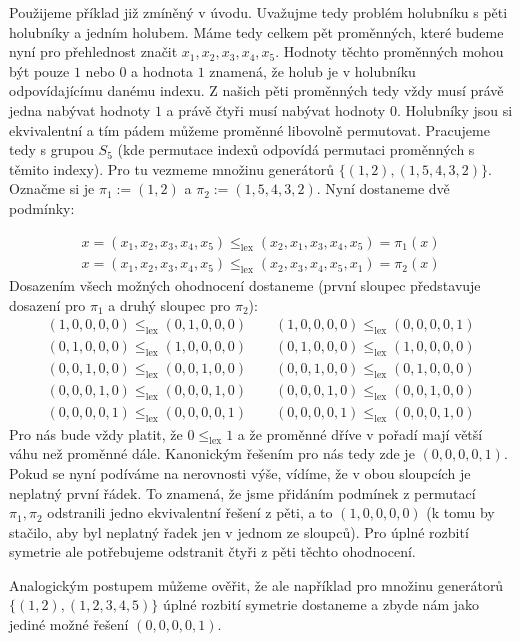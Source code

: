 \begin{prikl}
Použijeme příklad již zmíněný v úvodu. Uvažujme tedy problém holubníku s pěti holubníky a jedním holubem. Máme tedy celkem pět proměnných, které budeme nyní pro přehlednost značit $x_1, x_2, x_3, x_4, x_5$. Hodnoty těchto proměnných mohou být pouze $1$ nebo $0$ a hodnota $1$ znamená, že holub je v holubníku odpovídajícímu danému indexu. Z našich pěti proměnných tedy vždy musí právě jedna nabývat hodnoty $1$ a právě čtyři musí nabývat hodnoty $0$. Holubníky jsou si ekvivalentní a tím pádem můžeme proměnné libovolně permutovat. Pracujeme tedy s grupou $S_5$ (kde permutace indexů odpovídá permutaci proměnných s těmito indexy). Pro tu vezmeme množinu generátorů $\{(1,2),(1,5,4,3,2)\}$. Označme si je $\pi_1 := (1,2)$ a $\pi_2 := (1,5,4,3,2)$. Nyní dostaneme dvě podmínky:

\begin{align*}
x = (x_1, x_2, x_3, x_4, x_5) \leq_{\text{lex}} (x_2, x_1, x_3, x_4, x_5) = \pi_1(x) \\
x = (x_1, x_2, x_3, x_4, x_5) \leq_{\text{lex}} (x_2, x_3, x_4, x_5, x_1) = \pi_2(x)
\end{align*}
Dosazením všech možných ohodnocení dostaneme (první sloupec představuje dosazení pro $\pi_1$ a druhý sloupec pro $\pi_2$):
\begin{align*}
(1,0,0,0,0) \leq_{\text{lex}} (0,1,0,0,0) \qquad (1,0,0,0,0) \leq_{\text{lex}} (0,0,0,0,1) \\
(0,1,0,0,0) \leq_{\text{lex}} (1,0,0,0,0) \qquad (0,1,0,0,0) \leq_{\text{lex}} (1,0,0,0,0) \\
(0,0,1,0,0) \leq_{\text{lex}} (0,0,1,0,0) \qquad (0,0,1,0,0) \leq_{\text{lex}} (0,1,0,0,0) \\
(0,0,0,1,0) \leq_{\text{lex}} (0,0,0,1,0) \qquad (0,0,0,1,0) \leq_{\text{lex}} (0,0,1,0,0) \\
(0,0,0,0,1) \leq_{\text{lex}} (0,0,0,0,1) \qquad (0,0,0,0,1) \leq_{\text{lex}} (0,0,0,1,0)
\end{align*}
Pro nás bude vždy platit, že $0 \leq_{\text{lex}} 1$ a že proměnné dříve v pořadí mají větší váhu než proměnné dále. Kanonickým řešením pro nás tedy zde je $(0,0,0,0,1)$. Pokud se nyní podíváme na nerovnosti výše, vídíme, že v obou sloupcích je neplatný první řádek. To znamená, že jsme přidáním podmínek z permutací $\pi_1, \pi_2$ odstranili jedno ekvivalentní řešení z pěti, a to $(1,0,0,0,0)$ (k tomu by stačilo, aby byl neplatný řadek jen v jednom ze sloupců). Pro úplné rozbití symetrie ale potřebujeme odstranit čtyři z pěti těchto ohodnocení.

Analogickým postupem můžeme ověřit, že ale například pro množinu generátorů $\{(1,2),(1,2,3,4,5)\}$ úplné rozbití symetrie dostaneme a zbyde nám jako jediné možné řešení $(0,0,0,0,1)$.
\end{prikl}

